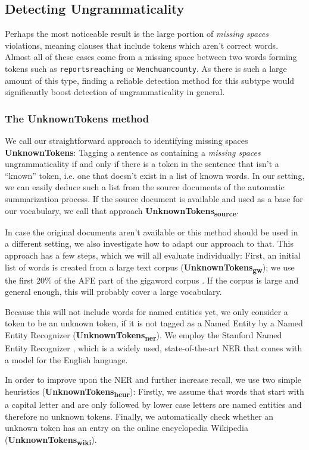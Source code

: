 \documentclass[a4paper,10pt]{scrartcl}
\theoremstyle{style}
\begin{document}
\subsection{Detecting Ungrammaticality}
\label{sec_unknowntokens}
Perhaps the most noticeable result is the large portion of \textit{missing spaces} violations, meaning clauses that include tokens which aren't correct words. Almost all of these cases come from a missing space between two words forming tokens such as \texttt{reportsreaching} or \texttt{Wenchuancounty}. As there is such a large amount of this type, finding a reliable detection method for this subtype would significantly boost detection of ungrammaticality in general.

\subsubsection{The UnknownTokens method}
We call our straightforward approach to identifying missing spaces \textbf{UnknownTokens}: Tagging a sentence as containing a \textit{missing spaces} ungrammaticality if and only if there is a token in the sentence that isn't a ``known'' token, i.e. one that doesn't exist in a list of known words. In our setting, we can easily deduce such a list from the source documents of the automatic summarization process. If the source document is available and used as a base for our vocabulary, we call that approach \textbf{UnknownTokens\textsubscript{source}}.

In case the original documents aren't available or this method should be used in a different setting, we also investigate how to adapt our approach to that. This approach has a few steps, which we will all evaluate individually:
First, an initial list of words is created from a large text corpus (\textbf{UnknownTokens\textsubscript{gw}}); we use the first 20\% of the AFE part of the gigaword corpus \citep{gigaword}. If the corpus is large and general enough, this will probably cover a large vocabulary.

Because this will not include words for named entities yet, we only consider a token to be an unknown token, if it is not tagged as a Named Entity by a Named Entity Recognizer (\textbf{UnknownTokens\textsubscript{ner}}). We employ the Stanford Named Entity Recognizer \citep{stanfordNER}, which is a widely used, state-of-the-art NER that comes with a model for the English language.

In order to improve upon the NER and further increase recall, we use two simple heuristics (\textbf{UnknownTokens\textsubscript{heur}}): Firstly, we assume that words that start with a capital letter and are only followed by lower case letters are named entities and therefore no unknown tokens. Finally, we automatically check whether an unknown token has an entry on the online encyclopedia Wikipedia (\textbf{UnknownTokens\textsubscript{wiki}}).
\end{document}
